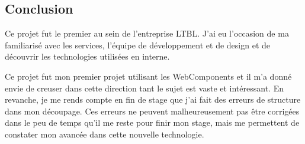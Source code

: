 \subsection{Conclusion}
\label{bmxconclusion}

Ce projet fut le premier au sein de l'entreprise LTBL.
J'ai eu l'occasion de ma familiarisé avec les services, l'équipe de développement et de design et de découvrir les technologies utilisées en interne.

Ce projet fut mon premier projet utilisant les WebComponents et il m'a donné envie de creuser dans cette direction tant le sujet est vaste et intéressant.
En revanche, je me rends compte en fin de stage que j'ai fait des erreurs de structure dans mon découpage.
Ces erreurs ne peuvent malheureusement pas être corrigées dans le peu de temps qu'il me reste pour finir mon stage, mais me permettent de constater mon avancée dans cette nouvelle technologie.
